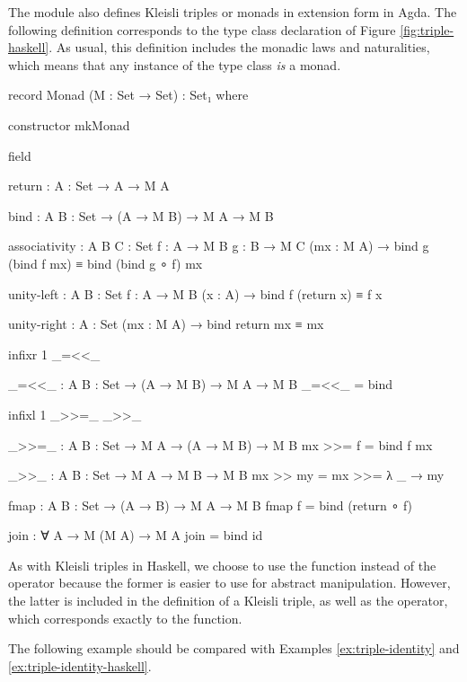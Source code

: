 The module  also defines Kleisli triples
or monads in extension form in Agda. The following definition
corresponds to the type class declaration of Figure
\ref{fig:triple-haskell}. As usual, this definition includes the
monadic laws and naturalities, which means that any instance of the
 type class \emph{is} a monad.

\begin{codeagda}
record Monad (M : Set → Set) : Set₁ where

  constructor mkMonad

  field

    return : {A : Set} → A → M A

    bind   : {A B : Set} → (A → M B) → M A → M B

    associativity : {A B C : Set} {f : A → M B} {g : B → M C} (mx : M A) →
                    bind g (bind f mx) ≡ bind (bind g ∘ f) mx

    unity-left    : {A B : Set} {f : A → M B} (x : A) →
                    bind f (return x) ≡ f x

    unity-right   : {A : Set} (mx : M A) → bind return mx ≡ mx

  infixr 1 _=<<_

  _=<<_ : {A B : Set} → (A → M B) → M A → M B
  _=<<_ = bind

  infixl 1 _>>=_ _>>_

  _>>=_ : {A B : Set} → M A → (A → M B) → M B
  mx >>= f = bind f mx

  _>>_ : {A B : Set} → M A → M B → M B
  mx >> my = mx >>= λ _ → my

  fmap : {A B : Set} → (A → B) → M A → M B
  fmap f = bind (return ∘ f)

  join : ∀ {A} → M (M A) → M A
  join = bind id
\end{codeagda}

As with Kleisli triples in Haskell, we choose to use the
 function instead of the \textagda{\_>>=\_} operator
because the former is easier to use for abstract manipulation.
However, the latter is included in the definition of a Kleisli triple,
as well as the \textagda{\_=<<\_} operator, which corresponds exactly
to the  function.

The following example should be compared with Examples
\ref{ex:triple-identity} and \ref{ex:triple-identity-haskell}.

